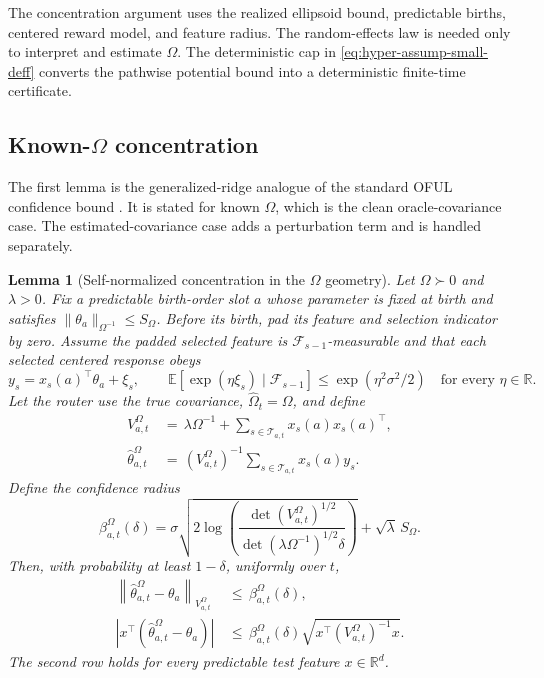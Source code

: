 \documentclass{article} %
\newtheorem{lemma}[theorem]{Lemma}
\begin{document}
The concentration argument uses the realized ellipsoid bound, predictable
births, centered reward model, and feature radius. The random-effects law is
needed only to interpret and estimate $\Omega$. The deterministic cap in
\eqref{eq:hyper-assump-small-deff} converts the pathwise potential bound into
a deterministic finite-time certificate.

\subsection{Known-\(\Omega\) concentration}

The first lemma is the generalized-ridge analogue of the standard OFUL confidence bound \citep{abbasi2011oful,chu2011linucb}.  It is stated for known \(\Omega\), which is the clean oracle-covariance case.  The estimated-covariance case adds a perturbation term and is handled separately.

\begin{lemma}[Self-normalized concentration in the \(\Omega\) geometry]
\label{lem:hyper-sn}
Let \(\Omega\succ0\) and \(\lambda>0\). Fix a predictable birth-order slot
\(a\) whose parameter is fixed at birth and satisfies
\(\|\theta_a\|_{\Omega^{-1}}\le S_\Omega\). Before its birth, pad its feature
and selection indicator by zero. Assume the padded selected feature is
\(\mathcal F_{s-1}\)-measurable and that each selected centered response obeys
\begin{equation}
y_s=x_s(a)^\top\theta_a+\xi_s,
\qquad
\mathbb E[\exp(\eta\xi_s)\mid\mathcal F_{s-1}]
\le \exp(\eta^2\sigma^2/2)
\quad\text{for every }\eta\in\mathbb R.
\end{equation}
Let the router use the true covariance, \(\widehat\Omega_t=\Omega\), and define
\begin{align}
V_{a,t}^{\Omega}
&\,=\,
\lambda\Omega^{-1}
+
\sum_{s\in\mathcal{T}_{a,t}}
x_s(a)x_s(a)^\top,
\label{eq:hyper-known-V}
\\
\widehat{\theta}_{a,t}^{\Omega}
&\,=\,
\left(V_{a,t}^{\Omega}\right)^{-1}
\sum_{s\in\mathcal{T}_{a,t}}
x_s(a)y_s.
\label{eq:hyper-known-est}
\end{align}
Define the confidence radius
\begin{equation}
\label{eq:hyper-beta}
\beta_{a,t}^{\Omega}(\delta)
=
\sigma
\sqrt{
2\log
\left(
\frac{
\det(V_{a,t}^{\Omega})^{1/2}
}{
\det(\lambda\Omega^{-1})^{1/2}\delta
}
\right)
}
+
\sqrt{\lambda}\,S_{\Omega}.
\end{equation}
Then, with probability at least \(1-\delta\), uniformly over \(t\),
\begin{align}
\left\|
\widehat{\theta}_{a,t}^{\Omega}-\theta_a
\right\|_{V_{a,t}^{\Omega}}
&\,\leq\,
\beta_{a,t}^{\Omega}(\delta),
\label{eq:hyper-sn-param}
\\
\left|
x^\top
\left(
\widehat{\theta}_{a,t}^{\Omega}-\theta_a
\right)
\right|
&\,\leq\,
\beta_{a,t}^{\Omega}(\delta)
\sqrt{x^\top\left(V_{a,t}^{\Omega}\right)^{-1}x}.
\label{eq:hyper-sn-prediction}
\end{align}
The second row holds for every predictable test feature \(x\in\mathbb R^d\).
\end{lemma}
\end{document}
